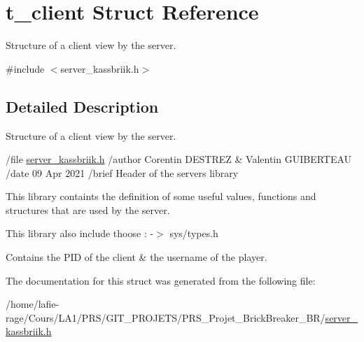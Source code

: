 \hypertarget{structt__client}{}\section{t\+\_\+client Struct Reference}
\label{structt__client}


Structure of a client view by the server.  




{\ttfamily \#include $<$server\+\_\+kassbriik.\+h$>$}



\subsection{Detailed Description}
Structure of a client view by the server. 

/file \hyperlink{server__kassbriik_8h}{server\+\_\+kassbriik.\+h} /author Corentin D\+E\+S\+T\+R\+EZ \& Valentin G\+U\+I\+B\+E\+R\+T\+E\+AU /date 09 Apr 2021 /brief Header of the server\textquotesingle{}s library

This library containts the definition of some useful values, functions and structures that are used by the server.

This library also include thoose \+: -\/$>$ sys/types.\+h

Contains the P\+ID of the client \& the username of the player. 

The documentation for this struct was generated from the following file\+:\begin{DoxyCompactItemize}
\item 
/home/lafie-\/rage/\+Cours/\+L\+A1/\+P\+R\+S/\+G\+I\+T\+\_\+\+P\+R\+O\+J\+E\+T\+S/\+P\+R\+S\+\_\+\+Projet\+\_\+\+Brick\+Breaker\+\_\+\+B\+R/\hyperlink{server__kassbriik_8h}{server\+\_\+kassbriik.\+h}\end{DoxyCompactItemize}
